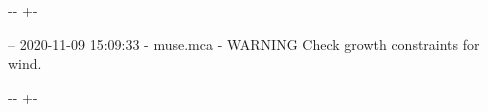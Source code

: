\documentclass[letterpaper,10pt,english]{sphinxmanual}
\newlength\nbsphinxcodecellspacing
\begin{document}
{

\kern-\sphinxverbatimsmallskipamount\kern-\baselineskip
\kern+\FrameHeightAdjust\kern-\fboxrule
\vspace{\nbsphinxcodecellspacing}

\begin{sphinxVerbatim}[commandchars=\\\{\}]
-- 2020-11-09 15:09:33 - muse.mca - WARNING
Check growth constraints for wind.

\end{sphinxVerbatim}
}

{

\kern-\sphinxverbatimsmallskipamount\kern-\baselineskip
\kern+\FrameHeightAdjust\kern-\fboxrule
\vspace{\nbsphinxcodecellspacing}

}
\end{document}
